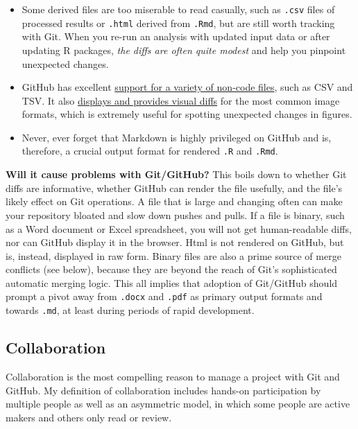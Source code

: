 \documentclass[12pt]{article}
\providecommand{\tightlist}{%
  \setlength{\itemsep}{0pt}\setlength{\parskip}{0pt}}
\begin{document}
\begin{itemize}
\tightlist
\item
  Some derived files are too miserable to read casually, such as
  \texttt{.csv} files of processed results or \texttt{.html} derived
  from \texttt{.Rmd}, but are still worth tracking with Git. When you
  re-run an analysis with updated input data or after updating R
  packages, \emph{the diffs are often quite modest} and help you
  pinpoint unexpected changes.
\item
  GitHub has excellent
  \href{https://help.github.com/categories/working-with-non-code-files/}{support
  for a variety of non-code files}, such as CSV and TSV. It also
  \href{https://help.github.com/articles/rendering-and-diffing-images/}{displays
  and provides visual diffs} for the most common image formats, which is
  extremely useful for spotting unexpected changes in figures.
\item
  Never, ever forget that Markdown is highly privileged on GitHub and
  is, therefore, a crucial output format for rendered \texttt{.R} and
  \texttt{.Rmd}.
\end{itemize}

\textbf{Will it cause problems with Git/GitHub?} This boils down to
whether Git diffs are informative, whether GitHub can render the file
usefully, and the file's likely effect on Git operations. A file that is
large and changing often can make your repository bloated and slow down
pushes and pulls. If a file is binary, such as a Word document or Excel
spreadsheet, you will not get human-readable diffs, nor can GitHub
display it in the browser. Html is not rendered on GitHub, but is,
instead, displayed in raw form. Binary files are also a prime source of
merge conflicts (see below), because they are beyond the reach of Git's
sophisticated automatic merging logic. This all implies that adoption of
Git/GitHub should prompt a pivot away from \texttt{.docx} and
\texttt{.pdf} as primary output formats and towards \texttt{.md}, at
least during periods of rapid development.

\subsection{Collaboration}\label{collaboration}

Collaboration is the most compelling reason to manage a project with Git
and GitHub. My definition of collaboration includes hands-on
participation by multiple people as well as an asymmetric model, in
which some people are active makers and others only read or review.
\end{document}
